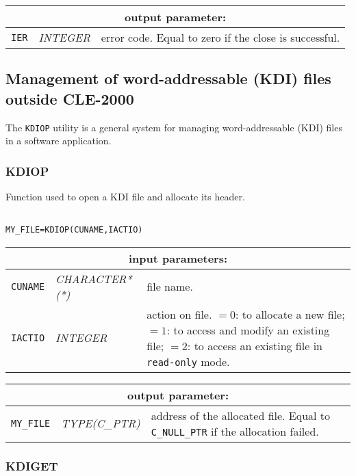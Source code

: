 \vskip 0.4cm
\noindent
\begin{tabular}{|p{1.5cm}|p{3cm}|p{10cm}|}
\hline
\multicolumn{3}{|c|}{\bf output parameter:} \\
\hline
{\tt IER} & {\it INTEGER}  & error code. Equal to zero if the close is successful.  \\
\hline
\end{tabular}

\clearpage

\subsection {Management of word-addressable (KDI) files outside CLE-2000}

The {\tt KDIOP} utility is a general system for managing word-addressable (KDI) files in a software application.

\subsubsection{KDIOP}

Function used to open a KDI file and allocate its header.

\begin{verbatim}

MY_FILE=KDIOP(CUNAME,IACTIO)
\end{verbatim}

\noindent
\begin{tabular}{|p{1.5cm}|p{3cm}|p{10cm}|}
\hline
\multicolumn{3}{|c|}{\bf input parameters:} \\
\hline
{\tt CUNAME} & {\it CHARACTER*(*)}  &  file name.  \\
\hline
{\tt IACTIO} & {\it INTEGER}  & action on file.
$=0$: to allocate a new file;
$=1$: to access and modify an existing file;
$=2$: to access an existing file in {\tt read-only} mode.  \\
\hline
\end{tabular}

\vskip 0.4cm
\noindent
\begin{tabular}{|p{1.5cm}|p{3cm}|p{10cm}|}
\hline
\multicolumn{3}{|c|}{\bf output parameter:} \\
\hline
{\tt MY\_FILE} & {\it TYPE(C\_PTR)}  & address of the allocated file. Equal to {\tt C\_NULL\_PTR} if the allocation failed.  \\
\hline
\end{tabular}

\subsubsection{KDIGET}

